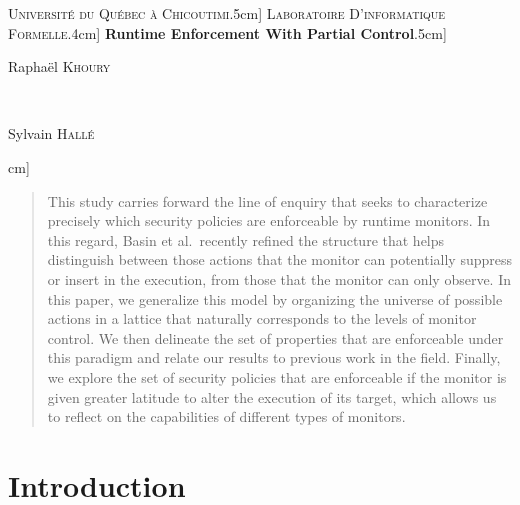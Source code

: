 \documentclass[12pt]{article}
\begin{document}
\begin{titlepage}

\newcommand{\HRule}{\rule{\linewidth}{0.5mm}} 
\center 

\textsc{\LARGE Universit\'{e} du Qu\'{e}bec \`{a} Chicoutimi}\0.5cm] \textsc{\large Laboratoire D'informatique Formelle}\0.4cm]
{ \huge \bfseries Runtime Enforcement With Partial Control}\1.5cm]


\begin{minipage}{0.4\textwidth}
\begin{flushleft} \large
Rapha\"{e}l \textsc{Khoury} \end{flushleft}
\end{minipage}
~
\begin{minipage}{0.4\textwidth}
\begin{flushright} \large
Sylvain \textsc{Hall\'{e}} \end{flushright}
\end{minipage}\2cm] 



\vfill 
\end{titlepage}


\begin{abstract}
This study carries forward the line of enquiry that seeks to characterize precisely which security policies are enforceable by runtime monitors. In this regard, Basin et al.\ recently refined the structure that helps distinguish between those actions that the monitor can potentially suppress or insert in the execution, from those that the monitor can only observe. In this paper, we generalize this model by organizing the universe of possible actions in a lattice that naturally corresponds to the levels of monitor control. We then delineate the set of properties that are enforceable under this paradigm and relate our results to previous work in the field. Finally, we explore the set of security policies that are enforceable if the monitor is given greater latitude to alter the execution of its target, which allows us to reflect on the capabilities of different types of monitors.
\end{abstract}

\section{Introduction}\label{sec:introduction}
\end{document}
